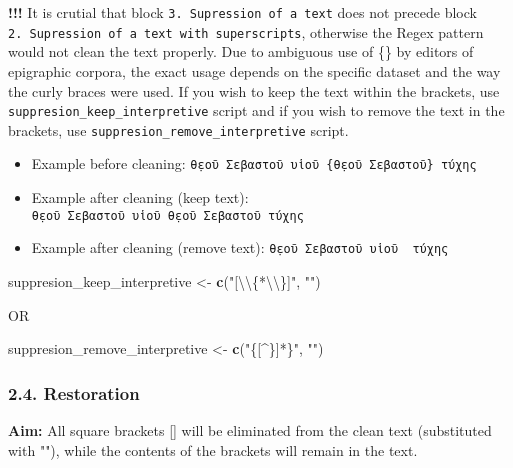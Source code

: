 \documentclass[]{article}
\newenvironment{Shaded}{\begin{snugshade}}{\end{snugshade}}
\newcommand{\CharTok}[1]{\textcolor[rgb]{0.31,0.60,0.02}{#1}}
\newcommand{\KeywordTok}[1]{\textcolor[rgb]{0.13,0.29,0.53}{\textbf{#1}}}
\newcommand{\NormalTok}[1]{#1}
\newcommand{\StringTok}[1]{\textcolor[rgb]{0.31,0.60,0.02}{#1}}
\providecommand{\tightlist}{%
  \setlength{\itemsep}{0pt}\setlength{\parskip}{0pt}}
\begin{document}
\textbf{!!!} It is crutial that block
\texttt{3.\ Supression\ of\ a\ text} does not precede block
\texttt{2.\ Supression\ of\ a\ text\ with\ superscripts}, otherwise the
Regex pattern would not clean the text properly. Due to ambiguous use of
\{\} by editors of epigraphic corpora, the exact usage depends on the
specific dataset and the way the curly braces were used. If you wish to
keep the text within the brackets, use
\texttt{suppresion\_keep\_interpretive} script and if you wish to remove
the text in the brackets, use \texttt{suppresion\_remove\_interpretive}
script.

\begin{itemize}
\tightlist
\item
  Example before cleaning:
  \texttt{θ̣εοῦ\ Σεβαστοῦ\ υἱοῦ\ \{θ̣εοῦ\ Σεβαστοῦ\}\ τύχης}
\item
  Example after cleaning (keep text):
  \texttt{θ̣εοῦ\ Σεβαστοῦ\ υἱοῦ\ θ̣εοῦ\ Σεβαστοῦ\ τύχης}
\item
  Example after cleaning (remove text):
  \texttt{θ̣εοῦ\ Σεβαστοῦ\ υἱοῦ\ \ τύχης}
\end{itemize}

\begin{Shaded}
\begin{Highlighting}[]
\NormalTok{suppresion_keep_interpretive <-}\StringTok{ }\KeywordTok{c}\NormalTok{(}\StringTok{"[}\CharTok{\textbackslash{}\textbackslash{}}\StringTok{\{*}\CharTok{\textbackslash{}\textbackslash{}}\StringTok{\}]"}\NormalTok{, }\StringTok{""}\NormalTok{)}
\end{Highlighting}
\end{Shaded}

OR

\begin{Shaded}
\begin{Highlighting}[]
\NormalTok{suppresion_remove_interpretive <-}\StringTok{ }\KeywordTok{c}\NormalTok{(}\StringTok{"\{[^\}]*\}"}\NormalTok{, }\StringTok{""}\NormalTok{)}
\end{Highlighting}
\end{Shaded}

\hypertarget{restoration-1}{%
\subsubsection{2.4. Restoration}\label{restoration-1}}

\textbf{Aim:} All square brackets {[}{]} will be eliminated from the
clean text (substituted with ""), while the contents of the brackets
will remain in the text.
\end{document}
